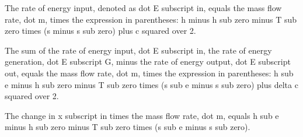 The rate of energy input, denoted as dot E subscript in, equals the mass flow rate, dot m, times the expression in parentheses: h minus h sub zero minus T sub zero times (s minus s sub zero) plus c squared over 2.

The sum of the rate of energy input, dot E subscript in, the rate of energy generation, dot E subscript G, minus the rate of energy output, dot E subscript out, equals the mass flow rate, dot m, times the expression in parentheses: h sub e minus h sub zero minus T sub zero times (s sub e minus s sub zero) plus delta c squared over 2.

The change in x subscript in times the mass flow rate, dot m, equals h sub e minus h sub zero minus T sub zero times (s sub e minus s sub zero).